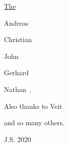 \medskip

\noindent \uline{The }

\smallskip
Andreas~

Chris\-tian~

John~

Gerhard~

Nathan~.

\medskip

Also thanks to Veit~

and so many others.

\bigskip
\Heart

\medskip
\hfill J.S. 2020